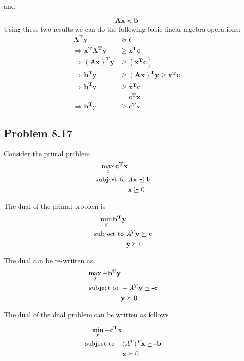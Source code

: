 \documentclass[letterpaper,12pt]{article}
\theoremstyle{definition}
\begin{document}
and 

\begin{equation*}
    \bm{Ax} \preceq \bm{b}
\end{equation*}
Using these two results we can do the following basic  linear algebra operations:
\begin{align*}
   \bm{A^Ty} &\succeq \bm{c} \\
   \Rightarrow \bm{x^TA^Ty} &\ge \bm {x^Tc}\\
   \Rightarrow \bm{(Ax)^Ty} &\ge \bm{(x^Tc)}\\
   \Rightarrow \bm{b^Ty} &\ge \bm{(Ax)^Ty} \ge \bm{x^Tc}\\
   \Rightarrow \bm{b^Ty} &\ge \bm{x^Tc}\\
   &=\bm{c^Tx}\\
   \Rightarrow \bm{b^Ty} &\ge \bm{c^Tx}
\end{align*}

\subsection*{Problem 8.17 }

Consider the primal problem
\begin{align*}
\max_{{x}} \mathbf{c^Tx} \\
\textnormal{subject to } &A\textbf{x}\preceq \textbf{b}\\
&\textbf{x} \succeq 0\\
\end{align*}

The dual of the primal problem is
\begin{align*}
\min_{{y}} \mathbf{b^Ty} \\
\textnormal{subject to } &A^T\textbf{y}\succeq \textbf{c}\\
&\textbf{y} \succeq 0\\
\end{align*}

The dual can be re-written as
\begin{align*}
\max_{{y}} \mathbf{-b^Ty} \\
\textnormal{subject to } &-A^T\textbf{y}\preceq \textbf{-c}\\
&\textbf{y} \succeq 0\\
\end{align*}

The dual of the dual problem can be written as follows

\begin{align*}
\min_{{x}} \mathbf{-c^Tx} \\
\textnormal{subject to } -&(A^T)^T\textbf{x} \succeq \textbf{-b}\\
&\textbf{x} \succeq 0\\
\end{align*}
\end{document}
